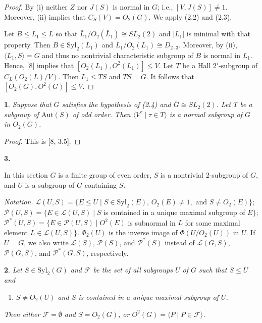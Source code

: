 \documentclass[11pt]{article}
\theoremstyle{plain}
\theoremstyle{stmplain}
\newtheorem{stm}{}[section]
\newcommand{\sect}[1]{\stepcounter{section}\par\vspace{14pt}%
  \begin{center}\textbf{#1.}\end{center}\vspace{2pt}}
\begin{document}
\begin{proof}
By (i) neither $Z$ nor $J(S)$ is normal in $G$; i.e., $[V, J(S)] \ne 1$.
Moreover, (ii) implies that $C_S(V) = O_2(G)$. We apply (2.2) and (2.3).

\smallskip
\noindent Let $B \le L_1 \le L$ so that $\bar{L}_1/O_2(\bar{L}_1) \cong SL_2(2)$ and
$|L_1|$ is minimal with that property. Then $B \in \mathrm{Syl}_2(L_1)$ and
$L_1/O_2(L_1) \cong D_{2 \cdot 3}$. Moreover, by (ii), $\langle L_1, S \rangle =
G$ and thus no nontrivial characteristic subgroup of $B$ is normal in $L_1$.
Hence, [8] implies that $[O_2(L_1), O^2(L_1)] \le V$. Let $T$ be a Hall
$2'$-subgroup of $C_L(O_2(L)/V)$. Then $L_1 \le TS$ and $TS = G$. It follows
that $[O_2(G), O^2(G)] \le V$.
\end{proof}

\begin{stm}\label{st:2.5}
Suppose that $G$ satisfies the hypothesis of (2.4) and $\bar{G} \cong SL_2(2)$.
Let $T$ be a subgroup of $\mathrm{Aut}(S)$ of odd order. Then $\langle V^{\tau}
\mid \tau \in T \rangle$ is a normal subgroup of $G$ in $O_2(G)$.
\end{stm}

\begin{proof}
This is [8, 3.5].
\end{proof}

\sect{3}

\noindent In this section $G$ is a finite group of even order, $S$ is a nontrivial
2-subgroup of $G$, and $U$ is a subgroup of $G$ containing $S$.

\smallskip
\noindent\textit{Notation.} \quad $\mathcal{L}(U, S) = \{E \le U \mid S \in
\mathrm{Syl}_2(E),\, O_2(E) \ne 1, \text{ and } S \ne O_2(E)\}$;
$\mathcal{P}(U, S) = \{E \in \mathcal{L}(U, S) \mid S$ is contained in a unique
maximal subgroup of $E\}$; $\mathcal{P}^*(U, S) = \{E \in \mathcal{P}(U, S)
\mid O^2(E)$ is subnormal in $L$ for some maximal element $L \in
\mathcal{L}(U, S)\}$. $\Phi_2(U)$ is the inverse image of $\Phi(U/O_2(U))$ in
$U$. If $U = G$, we also write $\mathcal{L}(S)$, $\mathcal{P}(S)$, and
$\mathcal{P}^*(S)$ instead of $\mathcal{L}(G, S)$, $\mathcal{P}(G, S)$, and
$\mathcal{P}^*(G, S)$, respectively.

\begin{stm}\label{st:3.1}
Let $S \in \mathrm{Syl}_2(G)$ and $\mathcal{F}$ be the set of all subgroups $U$
of $G$ such that $S \le U$ and
\begin{enumerate}
\item[(*)] $S \ne O_2(U)$ and $S$ is contained in a unique maximal subgroup of
  $U$.
\end{enumerate}
Then either $\mathcal{F} = \emptyset$ and $S = O_2(G)$, or $O^2(G) = \langle P
\mid P \in \mathcal{F} \rangle$.
\end{stm}
\end{document}
